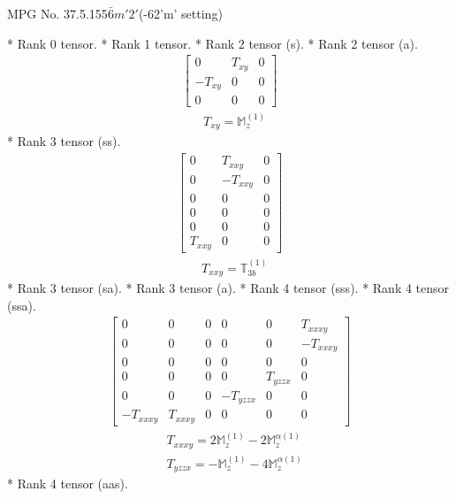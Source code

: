 \documentclass[fleqn,8pt,landscape]{jsarticle}
\begin{document}
\setcounter{MaxMatrixCols}{32}

\renewcommand{\tablename}{Table~}
\renewcommand{\figurename}{Figure~}
\begin{center}
\LARGE
MPG No. 37.5.155\quad$\bar{6}m'2'$\quad(-62'm' setting)
\end{center}
* Rank 0 tensor.
* Rank 1 tensor.
* Rank 2 tensor (s).
* Rank 2 tensor (a).
\begin{align*}
\begin{bmatrix} 0 & T_{xy} & 0 \\ - T_{xy} & 0 & 0 \\ 0 & 0 & 0 \end{bmatrix}
\end{align*}
\begin{align*}
& T_{xy} = \mathbb{M}_{z}^{(1)}
\end{align*}
* Rank 3 tensor (ss).
\begin{align*}
\begin{bmatrix} 0 & T_{xxy} & 0 \\ 0 & - T_{xxy} & 0 \\ 0 & 0 & 0 \\ 0 & 0 & 0 \\ 0 & 0 & 0 \\ T_{xxy} & 0 & 0 \end{bmatrix}
\end{align*}
\begin{align*}
& T_{xxy} = \mathbb{T}_{3b}^{(1)}
\end{align*}
* Rank 3 tensor (sa).
* Rank 3 tensor (a).
* Rank 4 tensor (sss).
* Rank 4 tensor (ssa).
\begin{align*}
\begin{bmatrix} 0 & 0 & 0 & 0 & 0 & T_{xxxy} \\ 0 & 0 & 0 & 0 & 0 & - T_{xxxy} \\ 0 & 0 & 0 & 0 & 0 & 0 \\ 0 & 0 & 0 & 0 & T_{yzzx} & 0 \\ 0 & 0 & 0 & - T_{yzzx} & 0 & 0 \\ - T_{xxxy} & T_{xxxy} & 0 & 0 & 0 & 0 \end{bmatrix}
\end{align*}
\begin{align*}
& T_{xxxy} = 2 \mathbb{M}_{z}^{(1)} - 2 \mathbb{M}_{z}^{\alpha(1)} \\
& T_{yzzx} = - \mathbb{M}_{z}^{(1)} - 4 \mathbb{M}_{z}^{\alpha(1)}
\end{align*}
* Rank 4 tensor (aas).
\end{document}
